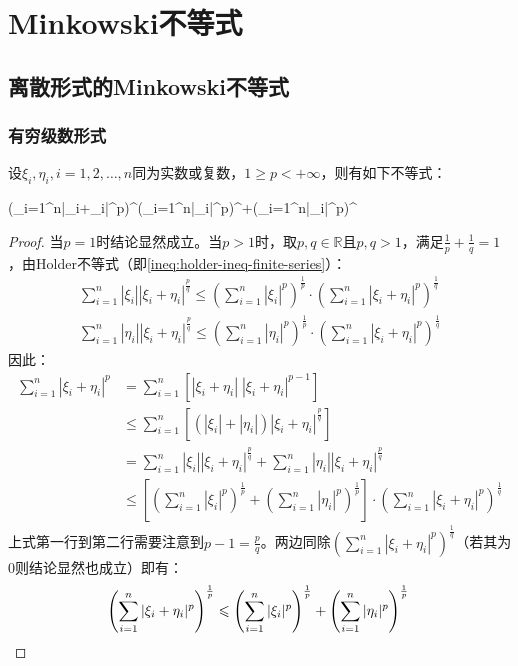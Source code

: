 \section{Minkowski不等式}

\subsection{离散形式的Minkowski不等式}
\subsubsection{有穷级数形式}
设$\xi_i,\eta_i,i=1,2,\dots,n$同为实数或复数，$1\geqslant p<+\infty$，则有如下不等式：
\begin{inequality*}\label{ineq:minkowski-ineq-finite-series}
	\left(\sum_{i=1}^n|\xi_i+\eta_i|^p\right)^\leqslant\left(\sum_{i=1}^n|\xi_i|^p\right)^+\left(\sum_{i=1}^n|\eta_i|^p\right)^
\end{inequality*}
\begin{proof}
	当$p=1$时结论显然成立。当$p>1$时，取$p,q\in\mathbb{R}$且$p,q>1$，满足$\frac{1}{p}+\frac{1}{q}=1$，由Holder不等式（即\cref{ineq:holder-ineq-finite-series}）：
	\begin{gather*}
		\sum_{i=1}^n|\xi_i||\xi_i+\eta_i|^\frac{p}{q}\leqslant\left(\sum_{i=1}^n|\xi_i|^p\right)^\frac{1}{p}\cdot\left(\sum_{i=1}^n|\xi_i+\eta_i|^p\right)^\frac{1}{q} \\
		\sum_{i=1}^n|\eta_i||\xi_i+\eta_i|^\frac{p}{q}\leqslant\left(\sum_{i=1}^n|\eta_i|^p\right)^\frac{1}{p}\cdot\left(\sum_{i=1}^n|\xi_i+\eta_i|^p\right)^\frac{1}{q} 
	\end{gather*}
	因此：
	\begin{align*}
		\sum_{i=1}^n|\xi_i+\eta_i|^p&=\sum_{i=1}^n\left[|\xi_i+\eta_i|\;|\xi_i+\eta_i|^{p-1}\right] \\
		&\leqslant\sum_{i=1}^n\left[(|\xi_i|+|\eta_i|)|\xi_i+\eta_i|^\frac{p}{q}\right] \\
		&=\sum_{i=1}^n|\xi_i||\xi_i+\eta_i|^\frac{p}{q}+\sum_{i=1}^n|\eta_i||\xi_i+\eta_i|^\frac{p}{q} \\
		&\leqslant\left[\left(\sum_{i=1}^n|\xi_i|^p\right)^\frac{1}{p}+\left(\sum_{i=1}^n|\eta_i|^p\right)^\frac{1}{p}\right]\cdot\left(\sum_{i=1}^n|\xi_i+\eta_i|^p\right)^\frac{1}{q} 
	\end{align*}
	上式第一行到第二行需要注意到$p-1=\frac{p}{q}$。两边同除$\left(\sum\limits_{i=1}^n|\xi_i+\eta_i|^p\right)^\frac{1}{q}$（若其为$0$则结论显然也成立）即有：
	\begin{equation*}
		\left(\sum_{i=1}^n|\xi_i+\eta_i|^p\right)^\frac{1}{p}\leqslant\left(\sum_{i=1}^n|\xi_i|^p\right)^\frac{1}{p}+\left(\sum_{i=1}^n|\eta_i|^p\right)^\frac{1}{p}\qedhere
	\end{equation*}
\end{proof}
